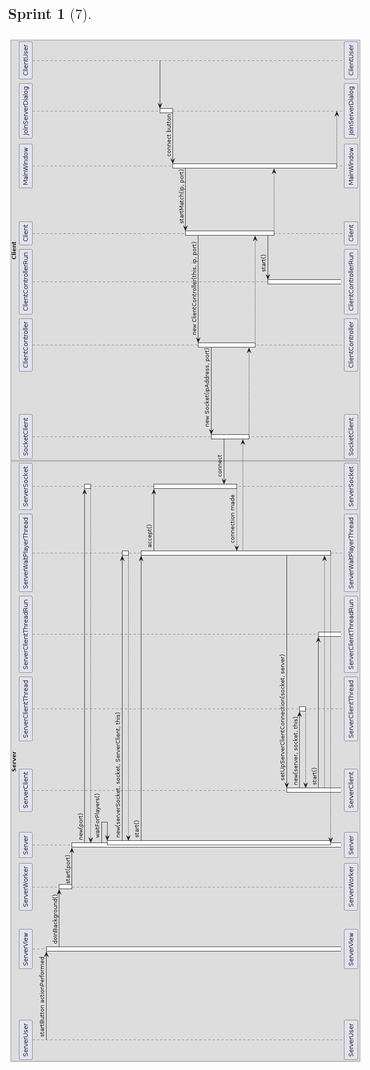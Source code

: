 \documentclass{article}
\theoremstyle{break}
\newtheorem*{sprint}{Sprint}
\begin{document}
\begin{sprint}[7]
\begin{center}
\includegraphics[scale=0.3]{umlconexionessprint7.png}
\end{center}


\end{sprint}
\end{document}
